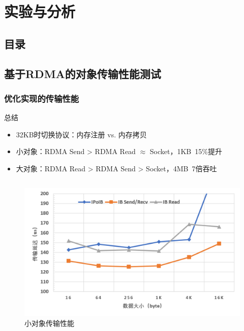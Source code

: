 \section{实验与分析}

\subsection*{目录}

\subsection*{基于RDMA的对象传输性能测试}

\begin{frame}
	\frametitle{优化实现的传输性能}

	\begin{block}{总结}
		\begin{itemize}
			\item 32KB时切换协议：内存注册 vs. 内存拷贝
			\item 小对象：RDMA Send > RDMA Read $\approx $ Socket，1KB~15\%提升
			\item 大对象：RDMA Read > RDMA Send > Socket，4MB~7倍吞吐
		\end{itemize}
	\end{block}

	\vspace{-1em}
	\begin{columns}[t]
		\begin{figure}
			\centering
			\includegraphics[width=\textwidth]{image/chap04/small.png}
			\caption{小对象传输性能}
		\end{figure}
		

\end{columns}
\end{frame}
